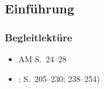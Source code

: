






\subsection{Einführung}
\nocite{Altmann&Co07a} \nocite{Hall00a} \nocite{Pompino95a} \nocite{Ramers08a} \nocite{Repp&Co12a} \nocite{WieseR96a} \nocite{WieseR11a}

\begin{frame}
\frametitle{Begleitlektüre}
\begin{itemize}
	\item AM S.~24--28
	\item \citet[Kapitel~8]{Hall00a}:  S.~205--230; 238--254)
\end{itemize}
\end{frame}

